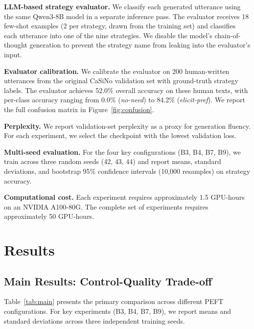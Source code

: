 \documentclass[conference]{IEEEtran}
\begin{document}
\textbf{LLM-based strategy evaluator.} We classify each generated utterance using the same Qwen3-8B model in a separate inference pass. The evaluator receives 18 few-shot examples (2 per strategy, drawn from the training set) and classifies each utterance into one of the nine strategies. We disable the model's chain-of-thought generation to prevent the strategy name from leaking into the evaluator's input.

\textbf{Evaluator calibration.} We calibrate the evaluator on 200 human-written utterances from the original CaSiNo validation set with ground-truth strategy labels. The evaluator achieves 52.0\% overall accuracy on these human texts, with per-class accuracy ranging from 0.0\% (\textit{no-need}) to 84.2\% (\textit{elicit-pref}). We report the full confusion matrix in Figure~\ref{fig:confusion}.

\textbf{Perplexity.} We report validation-set perplexity as a proxy for generation fluency. For each experiment, we select the checkpoint with the lowest validation loss.

\textbf{Multi-seed evaluation.} For the four key configurations (B3, B4, B7, B9), we train across three random seeds (42, 43, 44) and report means, standard deviations, and bootstrap 95\% confidence intervals (10,000 resamples) on strategy accuracy.

\textbf{Computational cost.} Each experiment requires approximately 1.5 GPU-hours on an NVIDIA A100-80G. The complete set of experiments requires approximately 50 GPU-hours.

\section{Results}

\subsection{Main Results: Control-Quality Trade-off}

Table~\ref{tab:main} presents the primary comparison across different PEFT configurations. For key experiments (B3, B4, B7, B9), we report means and standard deviations across three independent training seeds.
\end{document}
